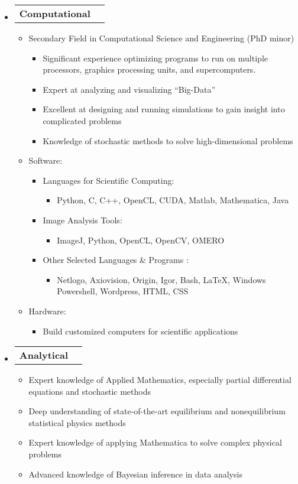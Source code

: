 \documentclass[letterpaper,11pt]{article}
\makeatletter
\newcommand{\resitem}[1]{\item #1 \vspace{-2pt}}
\newcommand{\award}[2]{\vspace{-5pt}
\begin{tabular*}{7.0in}{l@{\extracolsep{\fill}}r}
                \textbf{#1} & #2 
\end{tabular*}\vspace{-8pt}}
\makeatother
\begin{document}
\begin{itemize}

\item \award{Computational}{}

\begin{itemize}

\resitem{Secondary Field in Computational Science and Engineering (PhD minor)}
        \begin{itemize}
        \resitem{Significant experience optimizing programs to run on multiple processors, graphics processing units, and supercomputers.}
        \resitem{Expert at analyzing and visualizing ``Big-Data''}
        \resitem{Excellent at designing and running simulations to gain insight into complicated problems}
        \resitem{Knowledge of stochastic methods to solve high-dimensional problems}
        \end{itemize}

\resitem{Software:}

\begin{itemize}

        \resitem{Languages for Scientific Computing:} 
                \begin{itemize}
                \resitem{Python, C, C++, OpenCL, CUDA, Matlab, Mathematica, Java}
                \end{itemize}
                
        \resitem{Image Analysis Tools:}
                \begin{itemize}
                \resitem{ImageJ, Python, OpenCL, OpenCV, OMERO}
                \end{itemize}
        
        \resitem{Other Selected Languages \& Programs}:
                \begin{itemize}
                \resitem{Netlogo, Axiovision, Origin, Igor, Bash, \LaTeX, Windows Powershell, Wordpress, HTML, CSS}
                \end{itemize}
        
\end{itemize}

\resitem{Hardware:} 
        \begin{itemize}
        \resitem{Build customized computers for scientific applications}
        \end{itemize}

\end{itemize}

\item \award{Analytical}{}
\begin{itemize}
        \resitem{Expert knowledge of Applied Mathematics, especially partial differential equations and stochastic methods}
        \resitem{Deep understanding of state-of-the-art equilibrium and nonequilibrium statistical physics methods}
        \resitem{Expert knowledge of applying Mathematica to solve complex physical problems}
        \resitem{Advanced knowledge of Bayesian inference in data analysis}
\end{itemize}




\end{itemize}
\end{document}
